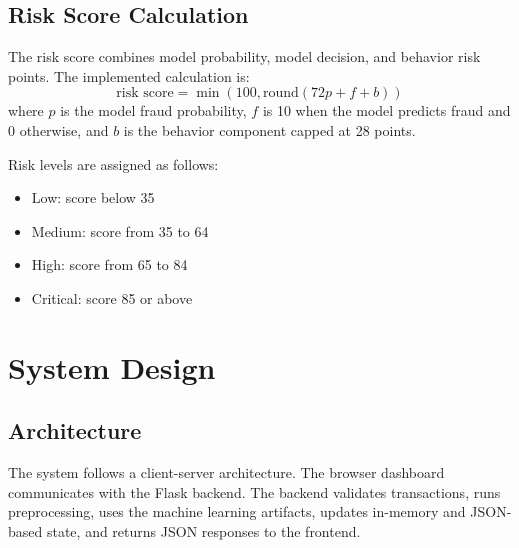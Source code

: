 \documentclass[12pt,a4paper]{report}
\begin{document}
\section{Risk Score Calculation}
The risk score combines model probability, model decision, and behavior risk points. The implemented calculation is:
\[
\text{risk score} = \min(100, \text{round}(72p + f + b))
\]
where \(p\) is the model fraud probability, \(f\) is 10 when the model predicts fraud and 0 otherwise, and \(b\) is the behavior component capped at 28 points.

Risk levels are assigned as follows:
\begin{itemize}
    \item Low: score below 35
    \item Medium: score from 35 to 64
    \item High: score from 65 to 84
    \item Critical: score 85 or above
\end{itemize}

\chapter{System Design}

\section{Architecture}
The system follows a client-server architecture. The browser dashboard communicates with the Flask backend. The backend validates transactions, runs preprocessing, uses the machine learning artifacts, updates in-memory and JSON-based state, and returns JSON responses to the frontend.
\end{document}
